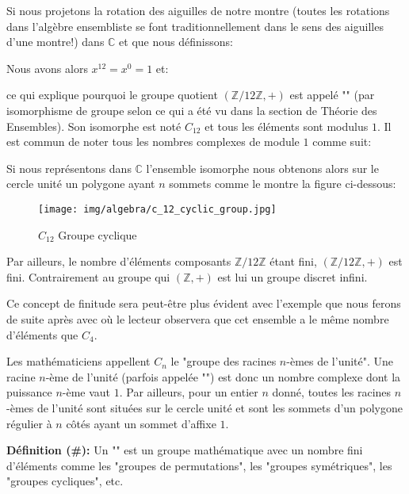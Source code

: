 \begin{enumerate}
		Si nous projetons la rotation des aiguilles de notre montre (toutes les rotations dans l'algèbre ensembliste se font traditionnellement dans le sens des aiguilles d'une montre!) dans $\mathbb{C}$ et que nous définissons:
		
		Nous avons alors $x^{12}=x^0=1$ et:
		
		ce qui explique pourquoi le groupe quotient $(\mathbb{Z}/12\mathbb{Z},+)$ est appelé "" (par isomorphisme de groupe selon ce qui a été vu dans la section de Théorie des Ensembles). Son isomorphe est noté $C_{12}$ et tous les éléments sont modulus $1$. Il est commun de noter tous les nombres complexes de module $1$ comme suit:
		
		Si nous représentons dans $\mathbb{C}$ l'ensemble isomorphe nous obtenons alors sur le cercle unité un polygone ayant  $n$ sommets comme le montre la figure ci-dessous:
		\begin{figure}[H]
			\centering
			\texttt{[image: img/algebra/c\_12\_cyclic\_group.jpg]}
			\caption{$C_{12}$ Groupe cyclique}
		\end{figure}
		Par ailleurs, le nombre d'éléments composants $\mathbb{Z}/12\mathbb{Z}$ étant fini, $(\mathbb{Z}/12\mathbb{Z},+)$ est fini. Contrairement au groupe qui $(\mathbb{Z},+)$ est lui un groupe discret infini. 
		
		Ce concept de finitude sera peut-être plus évident avec l'exemple que nous ferons de suite après avec où le lecteur observera que cet ensemble a le même nombre d'éléments que $C_4$.
	\end{enumerate}
	
	\begin{tcolorbox}[title=Remarque,colframe=black,arc=10pt]
	Les mathématiciens appellent $C_n$ le "groupe des racines $n$-èmes de l'unité". Une racine $n$-ème de l'unité (parfois appelée "") est donc un nombre complexe dont la puissance $n$-ème vaut $1$. Par ailleurs, pour un entier $n$ donné, toutes les racines $n$-èmes de l'unité sont situées sur le cercle unité et sont les sommets d'un polygone régulier à $n$ côtés ayant un sommet d'affixe $1$.
	\end{tcolorbox}
	
	\textbf{Définition (\#\mydef):} Un "\label{finite group}" est un groupe mathématique avec un nombre fini d'éléments comme les "groupes de permutations", les "groupes symétriques", les "groupes cycliques", etc.
	
